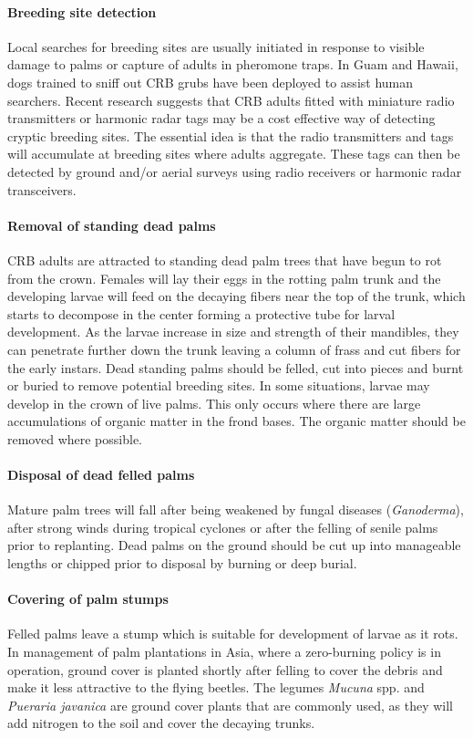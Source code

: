 \documentclass[twocolumn,letterpaper]{scrartcl}
\begin{document}
\paragraph{Breeding site detection}

Local searches for breeding sites are usually initiated in response to visible damage to palms or capture of adults in pheromone traps. In Guam and Hawaii, dogs trained to sniff out CRB grubs have been deployed to assist human searchers. Recent research suggests that CRB adults fitted with miniature radio transmitters or harmonic radar tags may be a cost effective way of detecting cryptic breeding sites. The essential idea is that the radio transmitters and tags will accumulate at breeding sites where adults aggregate. These tags can then be detected by ground and/or aerial surveys using radio receivers or harmonic radar transceivers.

\paragraph{Removal of standing dead palms}
CRB adults are attracted to standing dead palm trees that have begun to rot from the crown. Females will lay their eggs in the rotting palm trunk and the developing larvae will feed on the decaying fibers near the top of the trunk, which starts to decompose in the center forming a protective tube for larval development. As the larvae increase in size and strength of their mandibles, they can penetrate further down the trunk leaving a column of frass and cut fibers for the early instars. Dead standing palms should be felled, cut into pieces and burnt or buried to remove potential breeding sites. In some situations, larvae may develop in the crown of live palms. This only occurs where there are large accumulations of organic matter in the frond bases. The organic matter should be removed where possible.

\paragraph{Disposal of dead felled palms}
Mature palm trees will fall after being weakened by fungal diseases (\textit{Ganoderma}), after strong winds during tropical cyclones or after the felling of senile palms prior to replanting. Dead palms on the ground should be cut up into manageable lengths or chipped prior to disposal by burning or deep burial. 

\paragraph{Covering of palm stumps}
Felled palms leave a stump which is suitable for development of larvae as it rots. In management of palm plantations in Asia, where a zero-burning policy is in operation, ground cover is planted shortly after felling to cover the debris and make it less attractive to the flying beetles. The legumes \textit{Mucuna} spp. and \textit{Pueraria javanica} are ground cover plants that are commonly used, as they will add nitrogen to the soil and cover the decaying trunks. 
\end{document}

